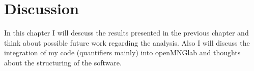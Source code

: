 \chapter{Discussion}

In this chapter I will descuss the results presented in the previous chapter and think about possible future work regarding the analysis. Also I will discuss the integration of my code (quantifiers mainly) into openMNGlab and thoughts about the structuring of the software.




\cleardoublepage
